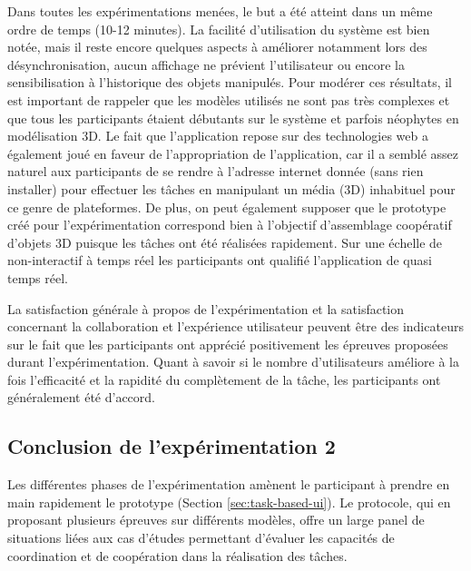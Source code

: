 Dans toutes les expérimentations menées, le but a été atteint dans 
un même ordre de temps (10-12 minutes). La facilité d'utilisation du système est 
bien notée, mais il reste encore quelques aspects à améliorer notamment lors des 
désynchronisation, aucun affichage ne prévient l'utilisateur ou encore la 
sensibilisation à l'historique des objets manipulés. 
Pour modérer ces résultats, il est important de rappeler que les modèles utilisés 
ne sont pas très complexes et que tous les participants étaient débutants sur le 
système et parfois néophytes en modélisation 3D.
Le fait que l'application repose sur des technologies web a également joué en 
faveur de l'appropriation de l'application, car il a semblé assez naturel aux 
participants de se rendre à l'adresse internet donnée (sans rien installer) pour 
effectuer les tâches en manipulant un média (3D) inhabituel pour ce genre de 
plateformes. 
De plus, on peut également supposer que le prototype créé pour l'expérimentation 
correspond bien à l'objectif d'assemblage coopératif d'objets \gls{3D} puisque les 
tâches ont été réalisées rapidement. Sur une échelle de \og non-interactif \fg{} à 
\og temps réel\fg{} les participants ont qualifié l'application de \og quasi temps 
réel\fg{}. 

La satisfaction générale à propos de l'expérimentation et la satisfaction concernant 
la collaboration et l'expérience utilisateur peuvent être des indicateurs sur le fait 
que les participants ont apprécié positivement les épreuves proposées durant 
l'expérimentation. 
Quant à savoir si le nombre d'utilisateurs améliore à la fois l'efficacité et la rapidité 
du complètement de la tâche, les participants ont généralement été d'accord.

\subsection{Conclusion de l'expérimentation 2}

Les différentes phases de l'expérimentation amènent le participant à prendre en 
main rapidement le prototype (Section \ref{sec:task-based-ui}). 
Le protocole, qui en proposant plusieurs épreuves sur différents modèles, offre un
large panel de situations liées aux cas d'études permettant d'évaluer les capacités 
de coordination et de coopération dans la réalisation des tâches.


